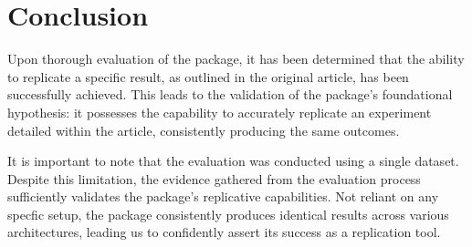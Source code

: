 \documentclass[sigconf, nonacm]{acmart}
\begin{document}
\section{Conclusion}

Upon thorough evaluation of the package, it has been determined that the ability to replicate a specific result, as outlined in the original article, has been successfully achieved. This leads to the validation of the package's foundational hypothesis: it possesses the capability to accurately replicate an experiment detailed within the article, consistently producing the same outcomes.

It is important to note that the evaluation was conducted using a single dataset. Despite this limitation, the evidence gathered from the evaluation process sufficiently validates the package's replicative capabilities. Not reliant on any specfic setup, the package consistently produces identical results across various architectures, leading us to confidently assert its success as a replication tool.




\end{document}
